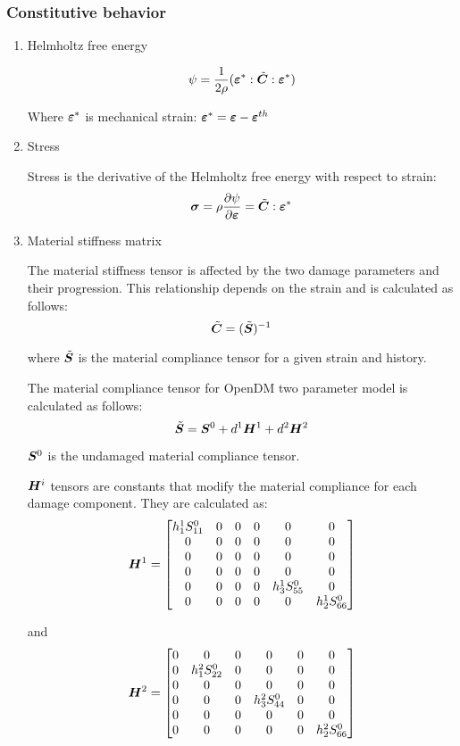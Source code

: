 \documentclass[11pt]{article}
\begin{document}
\subsubsection{Constitutive behavior}
\label{sec:org56e2ece}
\begin{enumerate}
\item Helmholtz free energy
\label{sec:org2452ccf}

\[
\psi = \frac{1}{2 \rho} (\bm{\varepsilon}^* : \tilde{\bm{C}} : \bm{\varepsilon}^*)
\]

Where \(\bm{\varepsilon}^*\) is mechanical strain:
\(\bm{\varepsilon}^* = \bm{\varepsilon} - \bm{\varepsilon}^{th}\)
\item Stress
\label{sec:orge0cf328}

Stress is the derivative of the Helmholtz free energy with respect to strain:
\[
\bm{\sigma} = \rho \frac{\partial \psi}{\partial \bm{\varepsilon}} =
\tilde{\bm{C}} : \bm{\varepsilon}^*
\]

\item Material stiffness matrix
\label{sec:org5d7b656}

The material stiffness tensor is affected by the two damage parameters
and their progression. This relationship depends on the strain and is
calculated as follows:
\[
\tilde{\bm{C}} = (\tilde{\bm{S}})^{-1}
\]

where \(\tilde{\bm{S}}\) is the material compliance tensor for a given
strain and history.

The material compliance tensor for OpenDM two parameter model is
calculated as follows:
\[
\tilde{\bm{S}} = \bm{S}^0 + d^1 \bm{H}^1 + d^2 \bm{H}^2
\]

\(\bm{S}^0\) is the undamaged material compliance tensor.

\(\bm{H}^i\) tensors are constants that modify the material
compliance for each damage component. They are calculated as:
\[
\bm{H}^1 =
\begin{bmatrix}
  h_1^1 S_{11}^0 & 0 & 0 & 0 & 0 & 0 \\
  0 & 0 & 0 & 0 & 0 & 0 \\
  0 & 0 & 0 & 0 & 0 & 0 \\
  0 & 0 & 0 & 0 & 0 & 0 \\
  0 & 0 & 0 & 0 & h_3^1 S_{55}^0 & 0 \\
  0 & 0 & 0 & 0 & 0 & h_2^1 S_{66}^0 
\end{bmatrix}
\]

and
\[
\bm{H}^2 =
\begin{bmatrix}
  0 & 0 & 0 & 0 & 0 & 0 \\
  0 & h_1^2 S_{22}^0 & 0 & 0 & 0 & 0 \\
  0 & 0 & 0 & 0 & 0 & 0 \\
  0 & 0 & 0 & h_3^2 S_{44}^0 & 0 & 0 \\
  0 & 0 & 0 & 0 & 0 & 0 \\
  0 & 0 & 0 & 0 & 0 & h_2^2 S_{66}^0 
\end{bmatrix}
\]


\end{enumerate}
\end{document}
